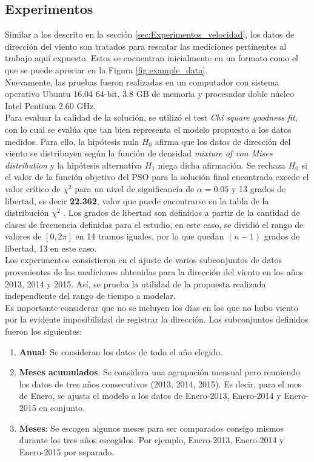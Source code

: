 \subsection{Experimentos}
Similar a los descrito en la sección \ref{sec:Experimentos_velocidad}, los datos de dirección del viento son tratados para rescatar las mediciones pertinentes al trabajo aquí expuesto. Estos se encuentran inicialmente en un formato como el que se puede apreciar en la Figura \ref{fig:example_data}.\\
Nuevamente, las pruebas fueron realizadas en un computador con sistema operativo Ubuntu 16.04 64-bit, 3.8 GB de memoria y procesador doble núcleo Intel Pentium 2.60 GHz.\\
Para evaluar la calidad de la solución, se utilizó el test \emph{Chi square goodness fit}\cite{goodFitTest}, con lo cual se evalúa que tan bien representa el modelo propuesto a los datos medidos. Para ello, la hipótesis nula $H_0$ afirma que los datos de dirección del viento se distribuyen según la función de densidad \emph{mixture of von Mises distribution} y la hipótesis alternativa $H_1$ niega dicha afirmación. Se rechaza $H_0$ si el valor de la función objetivo del PSO para la solución final encontrada excede el valor crítico de $\chi^2$ para un nivel de significancia de $\alpha = 0.05$ y 13 grados de libertad, es decir \textbf{22.362}, valor que puede encontrarse en la tabla de la distribución $\chi^2$ \cite{chiSquareTable}. Los grados de libertad son definidos a partir de la cantidad de clases de frecuencia definidas para el estudio, en este caso, se dividió el rango de valores de $[0, 2\pi]$ en 14 tramos iguales, por lo que quedan $(n-1)$ grados de libertad, 13 en este caso.\\
Los experimentos consistieron en el ajuste de varios subconjuntos de datos provenientes de las mediciones obtenidas para la dirección del viento en los años 2013, 2014 y 2015. Así, se prueba la utilidad de la propuesta realizada independiente del rango de tiempo a modelar.\\
Es importante considerar que no se incluyen los días en los que no hubo viento por la evidente imposibilidad de registrar la dirección.
Los subconjuntos definidos fueron los siguientes:
\begin{enumerate}
    \item \textbf{Anual}: Se consideran los datos de todo el año elegido.
    \item \textbf{Meses acumulados}: Se considera una agrupación mensual pero reuniendo los datos de tres años consecutivos (2013, 2014, 2015). Es decir, para el mes de Enero, se ajusta el modelo a los datos de Enero-2013, Enero-2014 y Enero-2015 en conjunto.
    \item \textbf{Meses}: Se escogen algunos meses para ser comparados consigo mismos durante los tres años escogidos. Por ejemplo, Enero-2013, Enero-2014 y Enero-2015 por separado.       
\end{enumerate}

